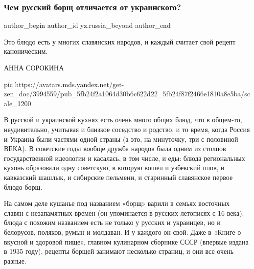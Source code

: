  
 
 
 
 
 
\subsubsection{Чем русский борщ отличается от украинского?}
\label{sec:17_11_2020.sites.ru.zen_yandex.yz.russia_beyond.1.russian_borsch}
\ifcmt
	author_begin
   author_id yz.russia_beyond
	author_end
\fi


Это блюдо есть у многих славянских народов, и каждый считает свой рецепт
каноническим.

АННА СОРОКИНА

\ifcmt
pic https://avatars.mds.yandex.net/get-zen_doc/3994559/pub_5fb24f2a1064d30b6c622d22_5fb24f87f2466e1810a8e5ba/scale_1200
\fi

В русской и украинской кухнях есть очень много общих блюд, что в общем-то,
неудивительно, учитывая и близкое соседство и родство, и то время, когда Россия
и Украина были частями одной страны (а это, на минуточку, три с половиной
ВЕКА). В советские годы вообще дружба народов была одним из столпов
государственной идеологии и касалась, в том числе, и еды: блюда региональных
кухонь образовали одну советскую, в которую вошел и узбекский плов, и
кавказский шашлык, и сибирские пельмени, и старинный славянское первое блюдо
борщ.

На самом деле кушанье под названием «борщ» варили в семьях восточных славян с
незапамятных времен (он упоминается в русских летописях с 16 века): блюда с
похожим названием есть не только у русских и украинцев, но и белорусов,
поляков, румын и молдаван. И у каждого он свой. Даже в «Книге о вкусной и
здоровой пище», главном кулинарном сборнике СССР (впервые издана в 1935 году),
рецепты борщей занимают несколько страниц, и они все очень разные.

